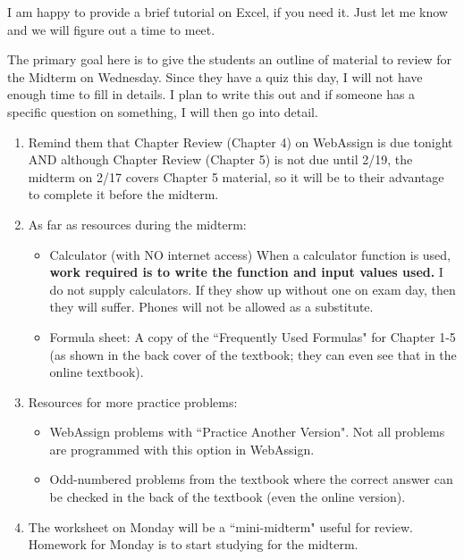 \documentclass{article}
\begin{document}
I am happy to provide a brief tutorial on Excel, if you need it.  Just let me know and we will figure out a time to meet.

\newpage

The primary goal here is to give the students an outline of material to review for the Midterm on Wednesday. Since they have a quiz this day, I will not have enough time to fill in details. I plan to write this out and if someone has a specific question on something, I will then go into detail.

\begin{enumerate}

    \item Remind them that Chapter Review (Chapter 4) on WebAssign is due tonight AND although Chapter Review (Chapter 5) is not due until 2/19, the midterm on 2/17 covers Chapter 5 material, so it will be to their advantage to complete it before the midterm.

    \item As far as resources during the midterm:
        
        \begin{itemize}
        
            \item Calculator (with NO internet access) When a calculator function is used, \textbf{work required is to write the function and input values used.} I do not supply calculators. If they show up without one on exam day, then they will suffer. Phones will not be allowed as a substitute.
            
            \item Formula sheet: A copy of the ``Frequently Used Formulas" for Chapter 1-5 (as shown in the back cover of the textbook; they can even see that in the online textbook).
            
        \end{itemize}
        
    \item Resources for more practice problems:
        
        \begin{itemize}
        
            \item WebAssign problems with ``Practice Another Version".  Not all problems are programmed with this option in WebAssign.
            
            \item Odd-numbered problems from the textbook where the correct answer can be checked in the back of the textbook (even the online version).
            
        \end{itemize}
    
    \item The worksheet on Monday will be a ``mini-midterm" useful for review. Homework for Monday is to start studying for the midterm.
    
\end{enumerate}
\end{document}
